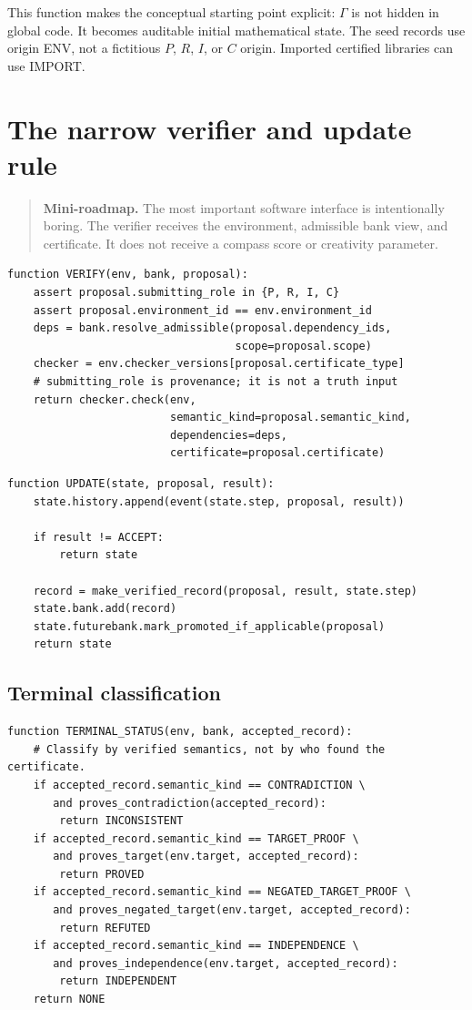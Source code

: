 \documentclass[11pt,openany]{book}
\theoremstyle{definition}
\theoremstyle{remark}
\newenvironment{miniroadmap}{\begin{quote}\small\color{deepblue}\textbf{Mini-roadmap.} }{\end{quote}}
\begin{document}
This function makes the conceptual starting point explicit: $\Gamma$ is not hidden in global code. It becomes auditable initial mathematical state. The seed records use origin \textsf{ENV}, not a fictitious $P$, $R$, $I$, or $C$ origin. Imported certified libraries can use \textsf{IMPORT}.

\chapter{The narrow verifier and update rule}
\begin{miniroadmap}
The most important software interface is intentionally boring. The verifier receives the environment, admissible bank view, and certificate. It does not receive a compass score or creativity parameter.
\end{miniroadmap}

\begin{lstlisting}[style=pseudo,caption={Narrow verification interface}]
function VERIFY(env, bank, proposal):
    assert proposal.submitting_role in {P, R, I, C}
    assert proposal.environment_id == env.environment_id
    deps = bank.resolve_admissible(proposal.dependency_ids,
                                   scope=proposal.scope)
    checker = env.checker_versions[proposal.certificate_type]
    # submitting_role is provenance; it is not a truth input
    return checker.check(env,
                         semantic_kind=proposal.semantic_kind,
                         dependencies=deps,
                         certificate=proposal.certificate)
\end{lstlisting}

\begin{lstlisting}[style=pseudo,caption={Verifier-gated update}]
function UPDATE(state, proposal, result):
    state.history.append(event(state.step, proposal, result))

    if result != ACCEPT:
        return state

    record = make_verified_record(proposal, result, state.step)
    state.bank.add(record)
    state.futurebank.mark_promoted_if_applicable(proposal)
    return state
\end{lstlisting}

\section{Terminal classification}
\begin{lstlisting}[style=pseudo,caption={Terminal settlement}]
function TERMINAL_STATUS(env, bank, accepted_record):
    # Classify by verified semantics, not by who found the certificate.
    if accepted_record.semantic_kind == CONTRADICTION \
       and proves_contradiction(accepted_record):
        return INCONSISTENT
    if accepted_record.semantic_kind == TARGET_PROOF \
       and proves_target(env.target, accepted_record):
        return PROVED
    if accepted_record.semantic_kind == NEGATED_TARGET_PROOF \
       and proves_negated_target(env.target, accepted_record):
        return REFUTED
    if accepted_record.semantic_kind == INDEPENDENCE \
       and proves_independence(env.target, accepted_record):
        return INDEPENDENT
    return NONE
\end{lstlisting}
\end{document}
